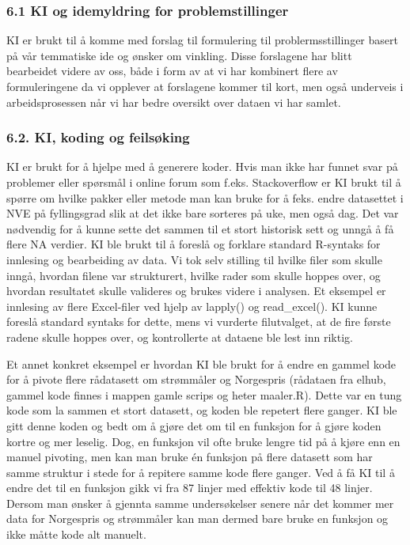 \documentclass[
  letterpaper,
  DIV=11,
  numbers=noendperiod]{scrartcl}
\begin{document}
\subsubsection{6.1 KI og idemyldring for
problemstillinger}\label{ki-og-idemyldring-for-problemstillinger}

KI er brukt til å komme med forslag til formulering til
problermsstillinger basert på vår temmatiske ide og ønsker om vinkling.
Disse forslagene har blitt bearbeidet videre av oss, både i form av at
vi har kombinert flere av formuleringene da vi opplever at forslagene
kommer til kort, men også underveis i arbeidsprosessen når vi har bedre
oversikt over dataen vi har samlet.

\subsubsection{6.2. KI, koding og
feilsøking}\label{ki-koding-og-feilsuxf8king}

KI er brukt for å hjelpe med å generere koder. Hvis man ikke har funnet
svar på problemer eller spørsmål i online forum som f.eks. Stackoverflow
er KI brukt til å spørre om hvilke pakker eller metode man kan bruke for
å feks. endre datasettet i NVE på fyllingsgrad slik at det ikke bare
sorteres på uke, men også dag. Det var nødvendig for å kunne sette det
sammen til et stort historisk sett og unngå å få flere NA verdier. KI
ble brukt til å foreslå og forklare standard R-syntaks for innlesing og
bearbeiding av data. Vi tok selv stilling til hvilke filer som skulle
inngå, hvordan filene var strukturert, hvilke rader som skulle hoppes
over, og hvordan resultatet skulle valideres og brukes videre i
analysen. Et eksempel er innlesing av flere Excel-filer ved hjelp av
lapply() og read\_excel(). KI kunne foreslå standard syntaks for dette,
mens vi vurderte filutvalget, at de fire første radene skulle hoppes
over, og kontrollerte at dataene ble lest inn riktig.

Et annet konkret eksempel er hvordan KI ble brukt for å endre en gammel
kode for å pivote flere rådatasett om strømmåler og Norgespris (rådataen
fra elhub, gammel kode finnes i mappen gamle scrips og heter maaler.R).
Dette var en tung kode som la sammen et stort datasett, og koden ble
repetert flere ganger. KI ble gitt denne koden og bedt om å gjøre det om
til en funksjon for å gjøre koden kortre og mer leselig. Dog, en
funksjon vil ofte bruke lengre tid på å kjøre enn en manuel pivoting,
men kan man bruke én funksjon på flere datasett som har samme struktur i
stede for å repitere samme kode flere ganger. Ved å få KI til å endre
det til en funksjon gikk vi fra 87 linjer med effektiv kode til 48
linjer. Dersom man ønsker å gjennta samme undersøkelser senere når det
kommer mer data for Norgespris og strømmåler kan man dermed bare bruke
en funksjon og ikke måtte kode alt manuelt.
\end{document}
